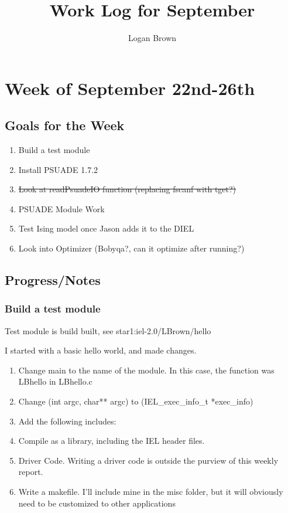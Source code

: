 

\title{Work Log for September}
\author{Logan Brown}


\maketitle


\setcounter{section}{0} %
\setcounter{subsection}{-1}
\setcounter{subsubsection}{0}

\section{Week of September 22nd-26th}
\subsection{Goals for the Week}
\begin{enumerate}
	\item Build a test module
	\item Install PSUADE 1.7.2
	\item \sout{Look at readPsuadeIO function (replacing fscanf with tget?)}
	\item PSUADE Module Work
	\item Test Ising model once Jason adds it to the DIEL
	\item Look into Optimizer (Bobyqa?, can it optimize after running?)
\end{enumerate}

\subsection{Progress/Notes}

\subsubsection{Build a test module}

Test module is build built, see star1:iel-2.0/LBrown/hello

I started with a basic hello world, and made changes.

\begin{enumerate}
\item Change main to the name of the module. In this case, the function was LBhello in LBhello.c
\item Change (int argc, char** argc) to (IEL\_exec\_info\_t *exec\_info)
\item Add the following includes:

\item Compile as a library, including the IEL header files.
\item Driver Code. Writing a driver code is outside the purview of this weekly report.
\item Write a makefile. I'll include mine in the misc folder, but it will obviously need to be customized to other applications
\end{enumerate}


